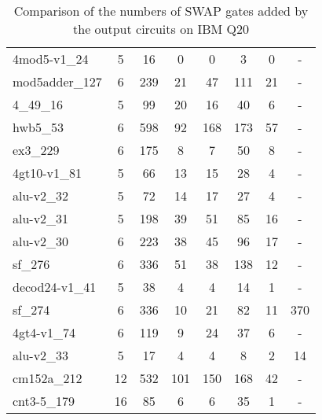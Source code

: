 \documentclass[journal]{IEEEtran}
\begin{document}
\begin{table*}[htbp]
\begin{center}
\begin{tabular}{|p{4.3cm}<{\centering}|c|c|c|c|c|c|c|}
4mod5-v1\_24 & 5 & 16 & 0 & 0 & 3 & 0 & - \\ 
mod5adder\_127 & 6 & 239 & 21 & 47 & 111 & 21 & - \\ 
4\_49\_16 & 5 & 99 & 20 & 16 & 40 & 6 & - \\ 
hwb5\_53 & 6 & 598 & 92 & 168 & 173 & 57 & - \\ 
ex3\_229 & 6 & 175 & 8 & 7 & 50 & 8 & - \\ 
4gt10-v1\_81 & 5 & 66 & 13 & 15 & 28 & 4 & - \\ 
alu-v2\_32 & 5 & 72 & 14 & 17 & 27 & 4 & - \\ 
alu-v2\_31 & 5 & 198 & 39 & 51 & 85 & 16 & - \\ 
alu-v2\_30 & 6 & 223 & 38 & 45 & 96 & 17 & - \\ 
sf\_276 & 6 & 336 & 51 & 38 & 138 & 12 & - \\ 
decod24-v1\_41 & 5 & 38 & 4 & 4 & 14 & 1 & - \\ 
sf\_274 & 6 & 336 & 10 & 21 & 82 & 11 & 370 \\ 
4gt4-v1\_74 & 6 & 119 & 9 & 24 & 37 & 6 & - \\ 
alu-v2\_33 & 5 & 17 & 4 & 4 & 8 & 2 & 14 \\ 
cm152a\_212 & 12 & 532 & 101 & 150 & 168 & 42 & - \\ 
cnt3-5\_179 & 16 & 85 & 6 & 6 & 35 & 1 & - \\
\hline
    \end{tabular} 
    \end{center}
    \caption{Comparison of  the numbers of SWAP gates added by the 
    output circuits on  IBM Q20 } 
    \label{tab3}
    \end{table*}
\end{document}
